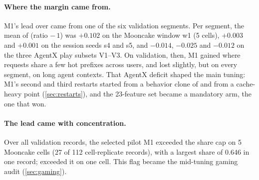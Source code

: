 \paragraph{Where the margin came from.}
M1's lead over  came from one of the six validation segments. Per
segment, the mean of (ratio $-\,1$) was $+0.102$ on the Mooncake window w1 (5 cells), $+0.003$ and
$+0.001$ on the session seeds s4 and s5, and $-0.014$, $-0.025$ and $-0.012$ on the three AgentX
play subsets V1--V3. On validation, then, M1 gained where requests share a few hot prefixes across
users, and lost slightly, but on every segment, on long agent contexts. That AgentX deficit shaped
the main tuning: M1's second and third restarts started from a behavior clone of
 and from a cache-heavy point (\cref{sec:restarts}), and the 23-feature
set  became a mandatory arm, the one that won.

\paragraph{The lead came with concentration.}
Over all validation records, the selected pilot M1 exceeded the share cap on 5 Mooncake cells (27
of 112 cell-replicate records), with a largest share of 0.646 in one record;
 exceeded it on one cell. This flag became the mid-tuning
gaming audit (\cref{sec:gaming}).

